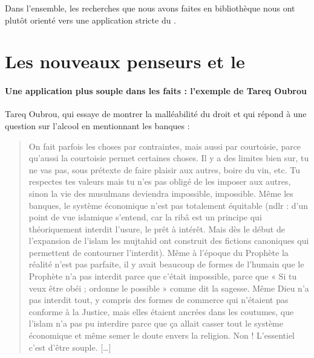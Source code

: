  Dans l'ensemble, les recherches que nous avons faites en bibliothèque nous ont plutôt orienté vers une application stricte du \riba. 
 
\section{Les nouveaux penseurs et le \riba}
 \paragraph{Une application plus souple dans les faits : l'exemple de Tareq Oubrou} Tareq Oubrou, qui essaye de montrer la malléabilité du droit et qui répond à une question sur l'alcool en mentionnant les banques : 
 \begin{quote}
    On fait parfois les choses par contraintes, mais aussi par courtoisie, parce qu’aussi la courtoisie permet certaines choses. Il y a des limites bien sur, tu ne vas pas, sous prétexte de faire plaisir aux autres, boire du vin, etc. Tu respectes tes valeurs mais tu n’es pas obligé de les imposer aux autres, sinon la vie des musulmans deviendra impossible, impossible. Même les banques, le système économique n’est pas totalement équitable (ndlr : d’un point de vue islamique s’entend, car la ribâ est un principe qui théoriquement interdit l’usure, le prêt à intérêt. Mais dès le début de l’expansion de l’islam les mujtahid ont construit des fictions canoniques qui permettent de contourner l’interdit). Même à l’époque du Prophète la réalité n’est pas parfaite, il y avait beaucoup de formes de l’humain que le Prophète n’a pas interdit parce que c’était impossible, parce que « Si tu veux être obéi ; ordonne le possible » comme dit la sagesse. Même Dieu n’a pas interdit tout, y compris des formes de commerce qui n’étaient pas conforme à la Justice, mais elles étaient ancrées dans les coutumes, que l’islam n’a pas pu interdire parce que ça allait casser tout le système économique et même semer le doute envers la religion. Non ! L’essentiel c’est d’être souple. […]  
 \end{quote}



